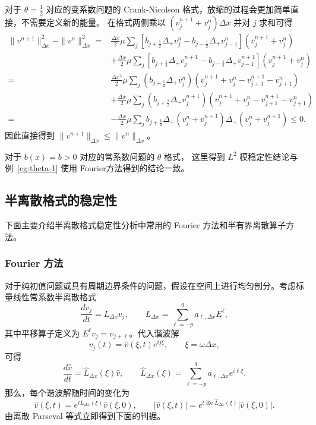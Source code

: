 \begin{remark}
    对于 $\theta = \frac12$ 对应的变系数问题的 Crank-Nicolson 格式，放缩的过程会更加简单直接，不需要定义新的能量。
    在格式两侧乘以 $(v_j^{n+1} + v_j^n)\Delta x$ 并对 $j$ 求和可得
    \begin{align*}
        \| v^{n+1}\|_{\Delta x}^2 - \| v^{n}\|_{\Delta x}^2
        ={} &
        \frac{\Delta x}2\mu \sum_j \left[ b_{j+\frac12} \Delta_+ v_{j}^n
            - b_{j-\frac12} \Delta_+ v_{j-1}^{n} \right](v_j^{n+1} + v_j^n)
        \\
            &
        + \frac{\Delta x}2\mu \sum_j \left[ b_{j+\frac12} \Delta_+ v_j^{n+1}
        - b_{j-\frac12} \Delta_+ v_{j-1}^{n+1} \right](v_j^{n+1} + v_j^n)
        \\
        ={} & \frac{\Delta x^2}2\mu \sum_j \left( b_{j+\frac12} \Delta_+ v_{j}^n \right)
        (v_j^{n+1} + v_j^n - v_{j+1}^{n+1} - v_{j+1}^n)
        \\
            &
        + \frac{\Delta x}2\mu \sum_j  \left( b_{j+\frac12} \Delta_+ v_{j}^{n+1} \right)
        (v_j^{n+1} + v_j^n - v_{j+1}^{n+1} - v_{j+1}^n)
        \\
        ={} & - \frac{\Delta x}2\mu \sum_j   b_{j+\frac12} \Delta_+ (v_{j}^n + v_{j}^{n+1})
        \Delta_+ (v_{j}^n + v_{j}^{n+1}) \le 0.
    \end{align*}
    因此直接得到 $\| v^{n+1}\|_{\Delta x} \le \| v^{n}\|_{\Delta x}$。
\end{remark}


\begin{remark}
    对于 $b(x) = b > 0$ 对应的常系数问题的 $\theta$ 格式，
    这里得到 $L^2$ 模稳定性结论与例~\ref{eg:theta-1} 使用 Fourier方法得到的结论一致。
\end{remark}

\subsection{半离散格式的稳定性}

下面主要介绍半离散格式稳定性分析中常用的 Fourier 方法和半有界离散算子方法。

\subsubsection{Fourier 方法}

对于纯初值问题或具有周期边界条件的问题，假设在空间上进行均匀剖分。考虑标量线性常系数半离散格式
\[
    \frac{d v_j}{dt}=L_{\Delta x}v_j,
    \qquad
    L_{\Delta x}=\sum_{\ell=-p}^{q}a_{\ell,\Delta x}E^\ell,
\]
其中平移算子定义为 $E^\ell v_j=v_{j+\ell}$。代入谐波解
\[
    v_j(t)=\widehat v(\xi,t)e^{i j\xi},
    \qquad \xi=\omega\Delta x,
\]
可得
\[
    \frac{d\widehat v}{dt}=\widehat L_{\Delta x}(\xi)\widehat v,
    \qquad
    \widehat L_{\Delta x}(\xi)=\sum_{\ell=-p}^{q}a_{\ell,\Delta x}e^{i \ell\xi}.
\]
那么，每个谐波解随时间的变化为
\[
    \widehat v(\xi,t)
    =e^{t\widehat L_{\Delta x}(\xi)}\widehat v(\xi,0),
    \qquad
    \left|\widehat v(\xi,t)\right|
    =e^{t\operatorname{Re}\widehat L_{\Delta x}(\xi)}
    \left|\widehat v(\xi,0)\right|.
\]
由离散 Parseval 等式立即得到下面的判据。

